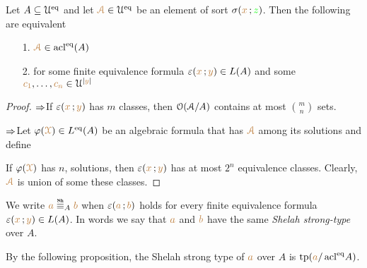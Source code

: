 \documentclass[creche.tex]{subfiles}
\begin{document}
\begin{theorem}\label{thm_set_alg=feq}
Let $A\subseteq\EuScript U^{{\rm eq}}$ and let ${\color{brown}\EuScript A}\in\EuScript U^{{\rm eq}}$ be an element of sort $\sigma({\color{brown} x}\,;{\color{green} z})$.  Then the following are equivalent
\begin{itemize}
\item[1.] ${\color{brown}\EuScript A}\in\mathop{\rm acl}^{{\rm eq}}(A)$
\item[2.] for some finite equivalence formula $\varepsilon({\color{brown} x}\,;{\color{brown} y})\in L(A)$ and some ${\color{brown} c_1},\dots,{\color{brown} c_n}\in\EuScript U^{|{\color{brown} y}|}$
\end{itemize}


\end{theorem}
\begin{proof} $\Rightarrow$\quad If  $\varepsilon({\color{brown} x}\,;{\color{brown} y})$ has $m$ classes, then $\EuScript O(\EuScript A/A)$ contains at most $\displaystyle{m\choose n}$ sets.

$\Rightarrow$\quad Let $\varphi({\color{brown}\EuScript X})\in L^{{\rm eq}}(A)$ be an algebraic formula that has ${\color{brown}\EuScript A}$ among its solutions and define


If $\varphi({\color{brown}\EuScript X})$ has $n$, solutions, then $\varepsilon({\color{brown} x}\,;{\color{brown} y})$ has at most $2^n$ equivalence classes. Clearly, ${\color{brown}\EuScript A}$ is union of some these classes.
\end{proof}

\begin{definition}\label{def_Sh_strong_type}
We write \emph{${\mr a}\stackrel{\smash{\scalebox{.5}{\rm\bf Sh}}}{\equiv}_A{\mr b}$} when $\varepsilon({\color{brown} a}\,;{\color{brown} b})$ holds for every finite equivalence formula $\varepsilon({\color{brown} x}\,;{\color{brown} y})\in L(A)$. In words we say that ${\color{brown} a}$ and ${\color{brown} b}$ have the same \emph{Shelah strong-type\/} over $A$.\QED
\end{definition}

By the following proposition, the Shelah strong type of ${\color{brown} a}$ over $A$ is ${\rm tp}({\color{brown} a}/\mathop{\rm acl}^{{\rm eq}}\!A)$.
\end{document}
